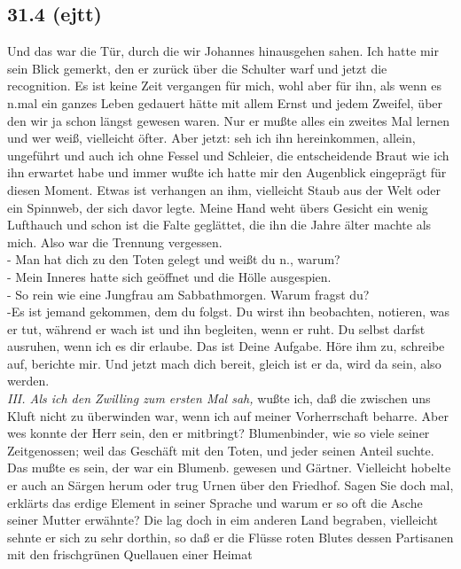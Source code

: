 \documentclass[
]{article}
\author{}
\date{\vspace{-2.5em}}
\begin{document}
\subsection{31.4 (ejtt)}\label{ejtt}

Und das war die Tür, durch die wir Johannes hinausgehen sahen. Ich hatte
mir sein Blick gemerkt, den er zurück über die Schulter warf und jetzt
die recognition. Es ist keine Zeit vergangen für mich, wohl aber für
ihn, als wenn es n.mal ein ganzes Leben gedauert hätte mit allem Ernst
und jedem Zweifel, über den wir ja schon längst gewesen waren. Nur er
mußte alles ein zweites Mal lernen und wer weiß, vielleicht öfter. Aber
jetzt: seh ich ihn hereinkommen, allein, ungeführt und auch ich ohne
Fessel und Schleier, die entscheidende Braut wie ich ihn erwartet habe
und immer wußte ich hatte mir den Augenblick eingeprägt für diesen
Moment. Etwas ist verhangen an ihm, vielleicht Staub aus der Welt oder
ein Spinnweb, der sich davor legte. Meine Hand weht übers Gesicht ein
wenig Lufthauch und schon ist die Falte geglättet, die ihn die Jahre
älter machte als mich. Also war die Trennung vergessen.\\
- Man hat dich zu den Toten gelegt und weißt du n., warum?\\
- Mein Inneres hatte sich geöffnet und die Hölle ausgespien.\\
- So rein wie eine Jungfrau am Sabbathmorgen. Warum fragst du?\\
-Es ist jemand gekommen, dem du folgst. Du wirst ihn beobachten,
notieren, was er tut, während er wach ist und ihn begleiten, wenn er
ruht. Du selbst darfst ausruhen, wenn ich es dir erlaube. Das ist Deine
Aufgabe. Höre ihm zu, schreibe auf, berichte mir. Und jetzt mach dich
bereit, gleich ist er da, wird da sein, also werden.\\
\emph{III. Als ich den Zwilling zum ersten Mal sah,} wußte ich, daß die
zwischen uns Kluft nicht zu überwinden war, wenn ich auf meiner
Vorherrschaft beharre. Aber wes konnte der Herr sein, den er mitbringt?
Blumenbinder, wie so viele seiner Zeitgenossen; weil das Geschäft mit
den Toten, und jeder seinen Anteil suchte. Das mußte es sein, der war
ein Blumenb. gewesen und Gärtner. Vielleicht hobelte er auch an Särgen
herum oder trug Urnen über den Friedhof. Sagen Sie doch mal, erklärts
das erdige Element in seiner Sprache und warum er so oft die Asche
seiner Mutter erwähnte? Die lag doch in eim anderen Land begraben,
vielleicht sehnte er sich zu sehr dorthin, so daß er die Flüsse roten
Blutes dessen Partisanen mit den frischgrünen Quellauen einer Heimat
\end{document}
